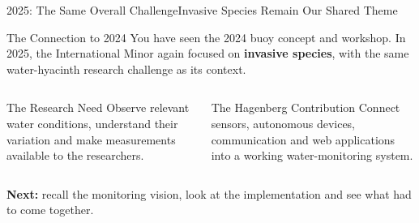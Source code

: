 \begin{frame}{2025: The Same Overall Challenge}{Invasive Species Remain Our Shared Theme}
\begin{block}{The Connection to 2024}
You have seen the 2024 buoy concept and workshop. In 2025, the International Minor again focused on \textbf{invasive species}, with the same water-hyacinth research challenge as its context.
\end{block}
\begin{columns}[T,onlytextwidth]
\begin{block}{The Research Need}
Observe relevant water conditions, understand their variation and make measurements available to the researchers.
\end{block}
\begin{block}{The Hagenberg Contribution}
Connect sensors, autonomous devices, communication and web applications into a working water-monitoring system.
\end{block}
\end{columns}
\vspace{.6em}
\textbf{Next:} recall the monitoring vision, look at the implementation and see what had to come together.
\end{frame}
